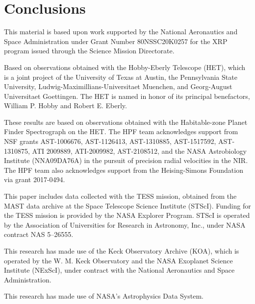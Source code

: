 \documentclass[twocolumn]{aastex631}
\begin{document}
\section{Conclusions}


\clearpage
\pagebreak


\appendix


\begin{acknowledgements}

    This material is based upon work supported by the National Aeronautics and Space Administration under Grant Number 80NSSC20K0257 for the XRP program issued through the Science Mission Directorate.

    Based on observations obtained with the Hobby-Eberly Telescope (HET), which is a joint project of the University of Texas at Austin, the Pennsylvania State University, Ludwig-Maximillians-Universitaet Muenchen, and Georg-August Universitaet Goettingen. The HET is named in honor of its principal benefactors, William P. Hobby and Robert E. Eberly.

    These results are based on observations obtained with the Habitable-zone Planet Finder Spectrograph on the HET. The HPF team acknowledges support from NSF grants AST-1006676, AST-1126413, AST-1310885, AST-1517592, AST-1310875, ATI 2009889, ATI-2009982, AST-2108512, and the NASA Astrobiology Institute (NNA09DA76A) in the pursuit of precision radial velocities in the NIR. The HPF team also acknowledges support from the Heising-Simons Foundation via grant 2017-0494.

    This paper includes data collected with the TESS mission, obtained from the MAST data archive at the Space Telescope Science Institute (STScI). Funding for the TESS mission is provided by the NASA Explorer Program. STScI is operated by the Association of Universities for Research in Astronomy, Inc., under NASA contract NAS 5–26555.

    This research has made use of the Keck Observatory Archive (KOA), which is operated by the W. M. Keck Observatory and the NASA Exoplanet Science Institute (NExScI), under contract with the National Aeronautics and Space Administration.

    This research has made use of NASA's Astrophysics Data System.
\end{acknowledgements}
\end{document}
